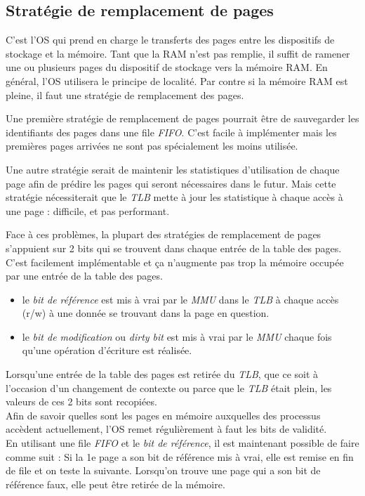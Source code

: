 \subsection{Stratégie de remplacement de pages}
C'est l'OS qui prend en charge le transferts des pages entre les dispositifs de stockage et la mémoire. Tant que la RAM n'est pas remplie, il suffit de ramener une ou plusieurs pages du dispositif de stockage vers la mémoire RAM.  En général, l'OS utilisera le principe de localité. Par contre si la mémoire RAM est pleine, il faut une stratégie de remplacement des pages.

Une première stratégie de remplacement de pages pourrait être de sauvegarder les identifiants des pages dans une file \textit{FIFO}. C'est facile à implémenter mais les premières pages arrivées ne sont pas spécialement les moins utilisée.

Une autre stratégie serait de maintenir les statistiques d'utilisation de chaque page afin de prédire les pages qui seront nécessaires dans le futur. Mais cette stratégie nécessiterait que le \textit{TLB} mette à jour les statistique à chaque accès à une page : difficile, et pas performant.

Face à ces problèmes, la plupart des stratégies de remplacement de pages s'appuient sur 2 bits qui se trouvent dans chaque entrée de la table des pages. C'est facilement implémentable et ça n'augmente pas trop la mémoire occupée par une entrée de la table des pages.
\begin{itemize}
  \item le \textit{bit de référence} est mis à vrai par le \textit{MMU} dans le \textit{TLB} à chaque accès (r/w) à une donnée se trouvant dans la page en question.
  \item le \textit{bit de modification} ou \textit{dirty bit} est mis à vrai par le \textit{MMU} chaque fois qu'une opération d'écriture est réalisée.
\end{itemize}
Lorsqu'une entrée de la table des pages est retirée du \textit{TLB}, que ce soit à l'occasion d'un changement de contexte ou parce que le \textit{TLB} était plein, les valeurs de ces 2 bits sont recopiées.  \\

Afin de savoir quelles sont les pages en mémoire auxquelles des processus accèdent actuellement, l'OS remet régulièrement à faut les bits de validité. \\

En utilisant une file \textit{FIFO} et le \textit{bit de référence}, il est maintenant possible de faire comme suit : Si la 1e page a son bit de référence mis à vrai, elle est remise en fin de file et on teste la suivante.
Lorsqu'on trouve une page qui a son bit de référence faux, elle peut être retirée de la mémoire.

